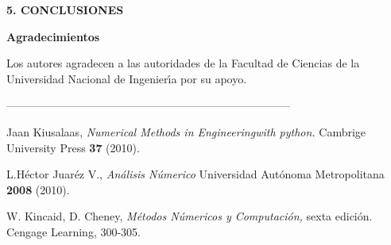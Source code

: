 \documentclass[10pt,a4paper]{article}
\begin{document}
\begin{multicols}{2}
\begin{center}
{\large \bf 5. CONCLUSIONES}
\end{center}

\begin{center}
{\large \bf Agradecimientos}
\end{center}
Los autores agradecen a las autoridades de la Facultad de Ciencias de la Universidad Nacional de 
Ingenier\'{\i}a por su apoyo.

\end{multicols}
\newpage

\begin{center}
 -----------------------------------------------------------------------------
\end{center}
\begin{multicols}{2}
\begin{list}{}{\setlength{\topsep}{0mm}\setlength{\itemsep}{0mm}%
\setlength{\parsep}{0mm}\setlength{\leftmargin}{4mm}}
%
\small
\item[1.] Jaan Kiusalaas, \textit{Numerical Methods in Engineering\linebreak with python.} Cambrige University Press \textbf{37} (2010).
\item[2.] L.Héctor Juaréz V., \textit{Análisis Númerico} Universidad Autónoma Metropolitana \textbf{2008} (2010).
\item[3.] W. Kincaid, D. Cheney, \textit{Métodos Númericos y Computación,} sexta edición. Cengage Learning, 300-305.
%
\end{list}
\end{multicols}
\end{document}

